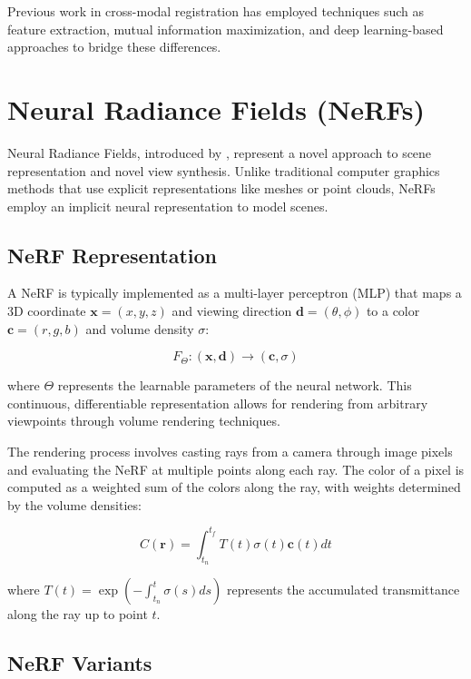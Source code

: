 Previous work in cross-modal registration has employed techniques such as feature extraction, mutual information maximization, and deep learning-based approaches to bridge these differences.

\section{Neural Radiance Fields (NeRFs)}

Neural Radiance Fields, introduced by \textcite{mildenhall2020nerf}, represent a novel approach to scene representation and novel view synthesis. Unlike traditional computer graphics methods that use explicit representations like meshes or point clouds, NeRFs employ an implicit neural representation to model scenes.

\subsection{NeRF Representation}

A NeRF is typically implemented as a multi-layer perceptron (MLP) that maps a 3D coordinate $\mathbf{x} = (x, y, z)$ and viewing direction $\mathbf{d} = (\theta, \phi)$ to a color $\mathbf{c} = (r, g, b)$ and volume density $\sigma$:

\begin{equation}
    F_\Theta: (\mathbf{x}, \mathbf{d}) \rightarrow (\mathbf{c}, \sigma)
\end{equation}

where $\Theta$ represents the learnable parameters of the neural network. This continuous, differentiable representation allows for rendering from arbitrary viewpoints through volume rendering techniques.

The rendering process involves casting rays from a camera through image pixels and evaluating the NeRF at multiple points along each ray. The color of a pixel is computed as a weighted sum of the colors along the ray, with weights determined by the volume densities:

\begin{equation}
    C(\mathbf{r}) = \int_{t_n}^{t_f} T(t) \sigma(t) \mathbf{c}(t) dt
\end{equation}

where $T(t) = \exp\left(-\int_{t_n}^{t} \sigma(s) ds\right)$ represents the accumulated transmittance along the ray up to point $t$.

\subsection{NeRF Variants}

